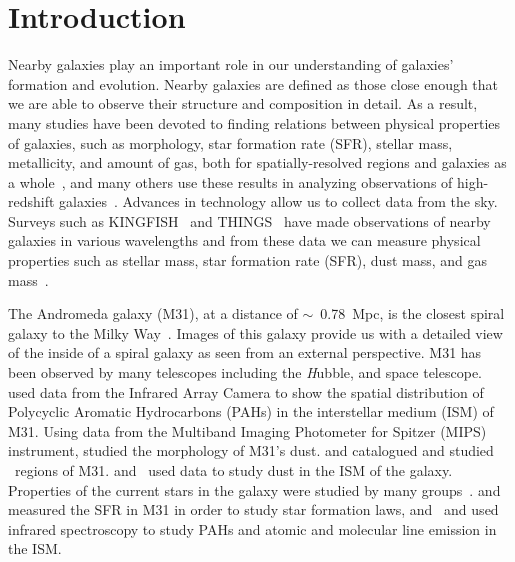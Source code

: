 \section{Introduction} 
Nearby galaxies play an important role in our understanding of galaxies' formation and evolution.
Nearby galaxies are defined as those close enough that we are able to observe their structure and composition in detail.
As a result, many studies have been devoted to finding relations between physical properties of galaxies, such as morphology, star formation rate (SFR), stellar mass, metallicity, and amount of gas, both for spatially-resolved regions and galaxies as a whole~\citep[e.g.][]{Wong13,Leroy08}, and many others use these results in analyzing observations of high-redshift galaxies~\citep[e.g.][]{Freundlich13,Walch11}.
Advances in technology allow us to collect data from the sky.
Surveys such as KINGFISH~\citep{Kennicutt11} and THINGS~\citep{Walter08} have made observations of nearby galaxies in various wavelengths and from these data we can measure physical properties such as stellar mass, star formation rate (SFR), dust mass, and gas mass~\citep[e.g.][]{Eskew12,Dale09,Calzetti07}.

The Andromeda galaxy (M31), at a distance of $\sim$~0.78~Mpc, is the closest spiral galaxy to the Milky Way~\citep{McConnachie05}.
Images of this galaxy provide us with a detailed view of the inside of a spiral galaxy as seen from an external perspective.
M31 has been observed by many telescopes including the {\textit Hubble}, \Spitzer and \Herschel space telescope.
\cite{Barmby06} used data from the \Spitzer Infrared Array Camera \citep[IRAC;][]{Fazio04} to show the spatial distribution of Polycyclic Aromatic Hydrocarbons (PAHs) in the interstellar medium (ISM) of M31.
Using data from the Multiband Imaging Photometer for Spitzer (MIPS) instrument, \cite{Gordon06} studied the morphology of M31's dust.
\cite{Azimlu11} and \cite{Sanders12} catalogued and studied \hii~regions of M31.
\cite{Draine14, Mattsson14, Viaene14, Smith12} and~\cite{Fritz12} used \Herschel data to study dust in the ISM of the galaxy.
Properties of the current stars in the galaxy were studied by many groups~\citep[e.g.][and references therein]{Tamm12,Dalcanton12,Massey07}.
\cite{Rahmani16, Ford13} and \cite{Tabatabaei10} measured the SFR in M31 in order to study star formation laws, and~\cite{Dim15} and \cite{Kapala15} used infrared spectroscopy to study PAHs and atomic and molecular line emission in the ISM.

